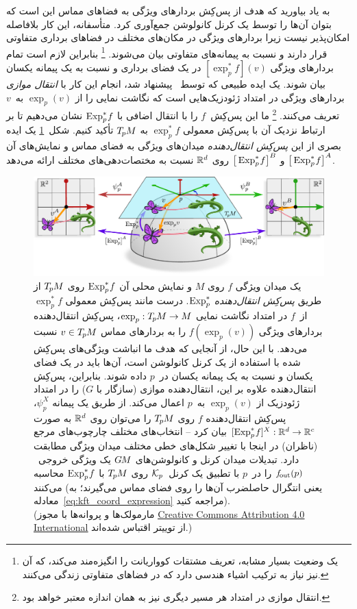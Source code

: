 به یاد بیاورید که هدف از پس‌کِش بردارهای ویژگی به فضاهای مماس این است که بتوان آن‌ها را توسط یک کرنل کانولوشن جمع‌آوری کرد.
متأسفانه، این کار بلافاصله امکان‌پذیر نیست زیرا بردارهای ویژگی در مکان‌های مختلف در فضاهای برداری متفاوتی قرار دارند و نسبت به پیمانه‌های متفاوتی بیان می‌شوند.%
\footnote{
	یک وضعیت بسیار مشابه، تعریف مشتقات کوواریانت را انگیزه‌مند می‌کند، که آن نیز نیاز به ترکیب اشیاء هندسی دارد که در فضاهای متفاوتی زندگی می‌کنند.
}
بنابراین لازم است تمام بردارهای ویژگی $[\exp_p^*f](v)$ در یک فضای برداری و نسبت به یک پیمانه یکسان بیان شوند.
یک ایده طبیعی که توسط~\citet{poulenard2018multi} پیشنهاد شد، انجام این کار با \emph{انتقال موازی} بردارهای ویژگی در امتداد ژئودزیک‌هایی است که نگاشت نمایی را از $\exp_p(v)$ به~$v$ تعریف می‌کنند.%
\footnote{
	انتقال موازی در امتداد هر مسیر دیگری نیز به همان اندازه معتبر خواهد بود.
}
ما این پس‌کِش~$f$ را با انتقال اضافی با $\operatorname{Exp}^*_p\mkern-2mu f$ نشان می‌دهیم تا بر ارتباط نزدیک آن با پس‌کِش معمولی $\exp_p^*f$ به $T_{\mkern-1.5mu p}\mkern-.5muM$ تأکید کنیم.
شکل~\ref{fig:pullback_field_exp_TpM} یک ایده بصری از این \emph{پس‌کِش انتقال‌دهنده} میدان‌های ویژگی به فضای مماس و نمایش‌های آن $\big[\operatorname{Exp}^*_p\mkern-2mu f\big]^A$ و $\big[\operatorname{Exp}^*_p\mkern-2mu f\big]^B$ روی $\mathbb{R}^d$ نسبت به مختصات‌دهی‌های مختلف ارائه می‌دهد.


\begin{figure}
	\centering
	\includegraphics[width=\textwidth]{figures/pullback_field_exp_TpM.pdf}
	\caption{\small
		یک میدان ویژگی $f$ روی $M$ و نمایش محلی آن $\operatorname{Exp}^*_p\mkern-2mu f$ روی $T_{\mkern-1.5mu p}\mkern-.5muM$ از طریق \emph{پس‌کِش انتقال‌دهنده} $\operatorname{Exp}^*_p$.
		درست مانند پس‌کِش معمولی $\exp_p^*f$ از~$f$ در امتداد نگاشت نمایی $\exp_p: T_{\mkern-1.5mu p}\mkern-.5muM \to M$، پس‌کِش انتقال‌دهنده بردارهای ویژگی $f(\exp_p(v))$ را به بردارهای مماس $v\in T_{\mkern-1.5mu p}\mkern-.5muM$ نسبت می‌دهد.
		با این حال، از آنجایی که هدف ما انباشت ویژگی‌های پس‌کِش شده با استفاده از یک کرنل کانولوشن است، آن‌ها باید در یک فضای یکسان و نسبت به یک پیمانه یکسان در~$p$ داده شوند.
		بنابراین، پس‌کِش انتقال‌دهنده علاوه بر این، انتقال‌دهنده موازی (سازگار با $G$) را در امتداد ژئودزیک از $\exp_p(v)$ به~$p$ اعمال می‌کند.
		از طریق یک پیمانه $\psi_p^X$، پس‌کِش انتقال‌دهنده $f$ روی $T_{\mkern-1.5mu p}\mkern-.5muM$ را می‌توان روی $\mathbb{R}^d$ به صورت $[\operatorname{Exp}^*_p\mkern-2mu f]^X: \mathbb{R}^d \to \mathbb{R}^c$ بیان کرد -- انتخاب‌های مختلف چارچوب‌های مرجع (ناظران) در اینجا با تغییر شکل‌های خطی مختلف میدان ویژگی مطابقت دارد.
		تبدیلات میدان کرنل و کانولوشن‌های $G\mkern-1.4muM$ یک ویژگی خروجی~$f_\textup{\:\!\!out}(p)$ را در~$p$ با تطبیق یک کرنل~$\mathcal{K}_p$ روی $T_{\mkern-1.5mu p}\mkern-.5muM$ با $\operatorname{Exp}^*_p\mkern-2mu f$ محاسبه می‌کنند (یعنی انتگرال حاصلضرب آن‌ها را روی فضای مماس می‌گیرند؛ به معادله~\eqref{eq:kft_coord_expression} مراجعه کنید).
		{ \\
			\color{gray}
			\scriptsize
			(مارمولک‌ها و پروانه‌ها با مجوز \href{https://github.com/twitter/twemoji/blob/gh-pages/LICENSE-GRAPHICS}{\underline{Creative Commons Attribution 4.0 International}} از توییتر اقتباس شده‌اند.)
		}
	}
	\label{fig:pullback_field_exp_TpM}
\end{figure}


